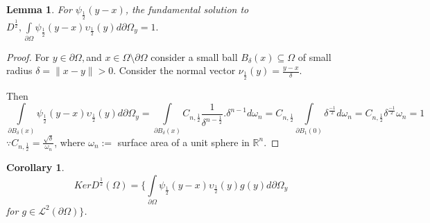 \documentclass{amsart}%
\providecommand{\U}[1]{\protect\rule{.1in}{.1in}}
\theoremstyle{plain}
\newtheorem{corollary}{Corollary}
\newtheorem{lemma}{Lemma}
\numberwithin{equation}{section}
\begin{document}
\begin{lemma}
For $\psi_{\frac{1}{2}}\left(  y-x\right)  $, the fundamental solution to
$D^{\frac{1}{2}},%
{\displaystyle\int\limits_{\partial\Omega}}
\psi_{\frac{1}{2}}\left(  y-x\right)  \upsilon_{\frac{1}{2}}\left(  y\right)
d\partial\Omega_{y}=1.$
\end{lemma}

\begin{proof}
For $y\in\partial\Omega,$and $x\in\Omega\setminus\partial\Omega$ consider a
small ball $B_{\delta}\left(  x\right)  \subseteq\Omega$ of small radius
$\delta=\parallel x-y\parallel>0.$ Consider the normal vector $\nu_{\frac
{1}{2}}\left(  y\right)  =\frac{y-x}{\delta}$.

Then
\[%
{\displaystyle\int\limits_{\partial B_{\delta}\left(  x\right)  }}
\psi_{\frac{1}{2}}\left(  y-x\right)  \upsilon_{\frac{1}{2}}\left(  y\right)
d\partial\Omega_{y}=%
{\displaystyle\int\limits_{\partial B_{\delta}\left(  x\right)  }}
C_{n,\frac{1}{2}}\frac{1}{\delta^{n-\frac{1}{2}}}.\delta^{n-1}d\omega
_{n}=C_{n,\frac{1}{2}}%
{\displaystyle\int\limits_{\partial B_{1}\left(  0\right)  }}
\delta^{\frac{-1}{2}}d\omega_{n}=C_{n,\frac{1}{2}}\delta^{\frac{-1}{2}}%
\omega_{n}=1
\]
$\because C_{n,\frac{1}{2}}=\frac{\sqrt{\delta}}{\omega_{n}}$, where
$\omega_{n}:=$ surface area of a unit sphere in $%
\mathbb{R}
^{n}$.
\end{proof}

\begin{corollary}%
\[
KerD^{\frac{1}{2}}\left(  \Omega\right)  =\{%
{\displaystyle\int\limits_{\partial\Omega}}
\psi_{\frac{1}{2}}\left(  y-x\right)  \upsilon_{\frac{1}{2}}\left(  y\right)
g(y)d\partial\Omega_{y}%
\]
for $g\in%
\mathcal{L}%
^{2}\left(  \partial\Omega\right)  \}$.
\end{corollary}
\end{document}
